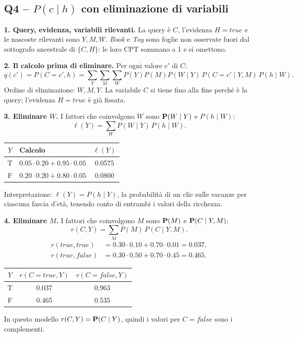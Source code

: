 \subsection*{Q4 -- $P(c\mid h)$ con eliminazione di variabili}


\textbf{1. Query, evidenza, variabili rilevanti.} La query è $C$, l'evidenza
$H=\mathit{true}$ e le nascoste rilevanti sono $Y,M,W$. \textit{Book} e
\textit{Toy} sono foglie non osservate fuori dal sottografo ancestrale di
$\{C,H\}$: le loro CPT sommano a 1 e si omettono.

\textbf{2. Il calcolo prima di eliminare.} Per ogni valore $c'$ di $C$:
\[
  q(c') = P(C=c',h) = \sum_Y\sum_M\sum_W P(Y)P(M)P(W\mid Y)\,P(C=c'\mid Y,M)\,P(h\mid W).
\]
Ordine di eliminazione: $W, M, Y$. La variabile $C$ si tiene fino alla fine
perché è la query; l'evidenza $H=\mathit{true}$ è già fissata.

\textbf{3. Eliminare $W$.} I fattori che coinvolgono $W$ sono $\mathbf{P}(W\mid Y)$ e
$P(h\mid W)$:
\[
  \ell(Y) = \sum_W P(W\mid Y)\,P(h\mid W).
\]
\begin{center}
\begin{tabular}{c|lc}
  $Y$ & Calcolo & $\ell(Y)$ \\ \midrule
  T & $0.05\cdot0.20 + 0.95\cdot0.05$ & 0.0575 \\
  F & $0.20\cdot0.20 + 0.80\cdot0.05$ & 0.0800
\end{tabular}
\end{center}
Interpretazione: $\ell(Y)=P(h\mid Y)$, la probabilità di un clic sulle vacanze
per ciascuna fascia d'età, tenendo conto di entrambi i valori della ricchezza.

\textbf{4. Eliminare $M$.} I fattori che coinvolgono $M$ sono $\mathbf{P}(M)$ e
$\mathbf{P}(C\mid Y,M)$:
\[
  r(C,Y) = \sum_M P(M)\,P(C\mid Y,M).
\]
\begin{align*}
  r(\mathit{true},\mathit{true})  &= 0.30\cdot0.10 + 0.70\cdot0.01 = 0.037,\\
  r(\mathit{true},\mathit{false}) &= 0.30\cdot0.50 + 0.70\cdot0.45 = 0.465.
\end{align*}
\begin{center}
\begin{tabular}{c|cc}
  $Y$ & $r(C=\mathit{true},Y)$ & $r(C=\mathit{false},Y)$ \\ \midrule
  T & 0.037 & 0.963 \\ F & 0.465 & 0.535
\end{tabular}
\end{center}
In questo modello $r(C,Y)=\mathbf{P}(C\mid Y)$, quindi i valori per $C=\mathit{false}$
sono i complementi.


